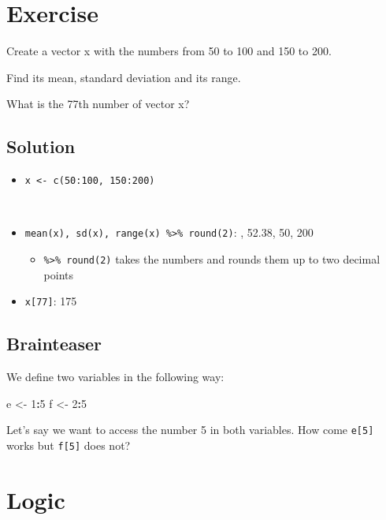 \documentclass[
]{book}
\newenvironment{Shaded}{\begin{snugshade}}{\end{snugshade}}
\newcommand{\DecValTok}[1]{\textcolor[rgb]{0.00,0.00,0.81}{#1}}
\newcommand{\NormalTok}[1]{#1}
\newcommand{\OtherTok}[1]{\textcolor[rgb]{0.56,0.35,0.01}{#1}}
\newcommand{\SpecialCharTok}[1]{\textcolor[rgb]{0.81,0.36,0.00}{\textbf{#1}}}
\providecommand{\tightlist}{%
  \setlength{\itemsep}{0pt}\setlength{\parskip}{0pt}}
\begin{document}
\section{Exercise}\label{exercise}

Create a vector x with the numbers from 50 to 100 and 150 to 200.

Find its mean, standard deviation and its range.

What is the 77th number of vector x?

\subsection{Solution}\label{solution}

\begin{itemize}
\tightlist
\item
  \texttt{x\ \textless{}-\ c(50:100,\ 150:200)}\strut \\
\item
  \texttt{mean(x),\ sd(x),\ range(x)\ \%\textgreater{}\%\ round(2)}: , 52.38, 50, 200

  \begin{itemize}
  \tightlist
  \item
    \texttt{\%\textgreater{}\%\ round(2)} takes the numbers and rounds them up to two decimal points
  \end{itemize}
\item
  \texttt{x{[}77{]}}: 175
\end{itemize}

\subsection{\texorpdfstring{Brainteaser }{Brainteaser }}\label{brainteaser}

We define two variables in the following way:

\begin{Shaded}
\begin{Highlighting}[]
\NormalTok{e }\OtherTok{\textless{}{-}} \DecValTok{1}\SpecialCharTok{:}\DecValTok{5}
\NormalTok{f }\OtherTok{\textless{}{-}} \DecValTok{2}\SpecialCharTok{:}\DecValTok{5}
\end{Highlighting}
\end{Shaded}

Let's say we want to access the number 5 in both variables.
How come \texttt{e{[}5{]}} works but \texttt{f{[}5{]}} does not?

\section{Logic}\label{logic}
\end{document}
